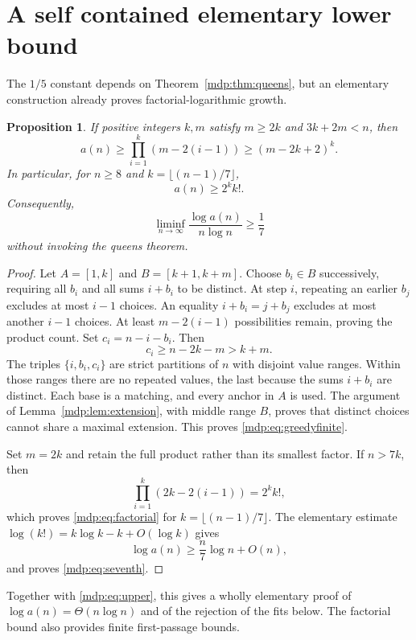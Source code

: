\documentclass[11pt,letterpaper]{article}
\numberwithin{equation}{section}
\newtheorem{proposition}[theorem]{Proposition}
\theoremstyle{remark}\newtheorem{remark}[theorem]{Remark}
\begin{document}
\section{A self contained elementary lower bound}
The $1/5$ constant depends on Theorem~\ref{mdp:thm:queens}, but an
elementary construction already proves factorial-logarithmic growth.

\begin{proposition}\label{mdp:prop:greedy}
If positive integers $k,m$ satisfy $m\ge2k$ and $3k+2m<n$, then
\begin{equation}\label{mdp:eq:greedyfinite}
 a(n)\ge\prod_{i=1}^k(m-2(i-1))\ge(m-2k+2)^k.
\end{equation}
In particular, for $n\ge8$ and $k=\lfloor(n-1)/7\rfloor$,
\begin{equation}\label{mdp:eq:factorial}
 a(n)\ge 2^k k!.
\end{equation}
Consequently,
\begin{equation}\label{mdp:eq:seventh}
 \liminf_{n\to\infty}\frac{\log a(n)}{n\log n}\ge\frac17
\end{equation}
without invoking the queens theorem.
\end{proposition}
\begin{proof}
Let $A=[1,k]$ and $B=[k+1,k+m]$. Choose $b_i\in B$ successively,
requiring all $b_i$ and all sums $i+b_i$ to be distinct. At step $i$,
repeating an earlier $b_j$ excludes at most $i-1$ choices. An equality
$i+b_i=j+b_j$ excludes at most another $i-1$ choices. At least
$m-2(i-1)$ possibilities remain, proving the product count.
Set $c_i=n-i-b_i$. Then
\[
 c_i\ge n-2k-m>k+m.
\]
The triples $\{i,b_i,c_i\}$ are strict partitions of $n$ with disjoint
value ranges. Within those ranges there are no repeated values, the
last because the sums $i+b_i$ are distinct. Each base is a matching,
and every anchor in $A$ is used. The argument of
Lemma~\ref{mdp:lem:extension}, with middle range $B$, proves that distinct
choices cannot share a maximal extension. This proves
\eqref{mdp:eq:greedyfinite}.

Set $m=2k$ and retain the full product rather than its smallest
factor. If $n>7k$, then
\[
 \prod_{i=1}^k(2k-2(i-1))=2^k k!,
\]
which proves \eqref{mdp:eq:factorial} for $k=\lfloor(n-1)/7\rfloor$.
The elementary estimate
$\log(k!)=k\log k-k+O(\log k)$ gives
\[
 \log a(n)\ge\frac n7\log n+O(n),
\]
and proves \eqref{mdp:eq:seventh}.
\end{proof}
Together with \eqref{mdp:eq:upper}, this gives a wholly elementary proof
of $\log a(n)=\Theta(n\log n)$ and of the rejection of the fits below.
The factorial bound also provides finite first-passage bounds.
\end{document}
